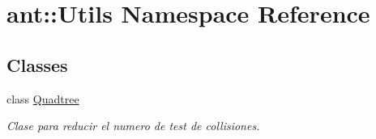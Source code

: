 \hypertarget{namespaceant_1_1_utils}{\section{ant\+:\+:Utils Namespace Reference}
\label{namespaceant_1_1_utils}
}
\subsection*{Classes}
\begin{DoxyCompactItemize}
\item 
class \hyperlink{classant_1_1_utils_1_1_quadtree}{Quadtree}
\begin{DoxyCompactList}\small\item\em Clase para reducir el numero de test de collisiones. \end{DoxyCompactList}\end{DoxyCompactItemize}
